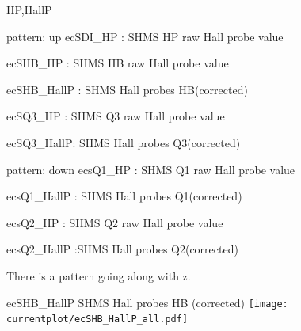 \documentclass[aspectratio=169,xcolor=dvipsnames]{beamer}
\begin{document}
\begin{frame}{HP,HallP}
    \begin{block}{pattern: up}
    ecSDI\_HP : SHMS HP raw Hall probe value
    
    ecSHB\_HP : SHMS HB raw Hall probe value
    
    ecSHB\_HallP : SHMS Hall probes HB(corrected) 
    
    ecSQ3\_HP : SHMS Q3 raw Hall probe value
    
    ecSQ3\_HallP: SHMS Hall probes Q3(corrected)
    \end{block}
    \begin{block}{pattern: down}
    ecsQ1\_HP : SHMS Q1 raw Hall probe value
    
    ecsQ1\_HallP : SHMS Hall probes Q1(corrected)
    
    ecsQ2\_HP : SHMS Q2 raw Hall probe value
    
    ecsQ2\_HallP :SHMS Hall probes Q2(corrected)
    \end{block}
There is a pattern going along with z.     
    
    
\end{frame}

\begin{frame}{ecSHB\_HallP}
    SHMS Hall probes HB (corrected)
    \texttt{[image: currentplot/ecSHB\_HallP\_all.pdf]}
\end{frame}
\end{document}
